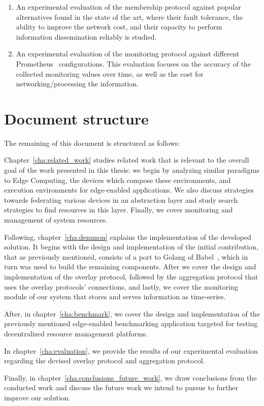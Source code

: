 \begin{enumerate}
    \item An experimental evaluation of the membership protocol against popular alternatives found in the state of the art, where their fault tolerance, the ability to improve the network cost, and their capacity to perform information dissemination reliably is studied. 

    \item An experimental evaluation of the monitoring protocol against different Prometheus~\cite{prometheus} configurations. This evaluation focuses on the accuracy of the collected monitoring values over time, as well as the cost for networking/processing the information.
    
\end{enumerate}

\section{Document structure}

The remaining of this document is structured as follows: 

Chapter~\ref{cha:related_work} studies related work that is relevant to the overall goal of the work presented in this thesis: we begin by analyzing similar paradigms to Edge Computing, the devices which compose these environments, and execution environments for edge-enabled applications. We also discuss strategies towards federating various devices in an abstraction layer and study search strategies to find resources in this layer. Finally, we cover monitoring and management of system resources.

Following, chapter~\ref{cha:demmon} explains the implementation of the developed solution. It begins with the design and implementation of the initial contribution, that as previously mentioned, consists of a port to Golang of Babel~\cite{babel}, which in turn was used to build the remaining components. After we cover the design and implementation of the overlay protocol, followed by the aggregation protocol that uses the overlay protocols' connections, and lastly, we cover the monitoring module of our system that stores and serves information as time-series.

After, in chapter~\ref{cha:benchmark}, we cover the design and implementation of the previously mentioned edge-enabled benchmarking application targeted for testing decentralized resource management platforms.

In chapter~\ref{cha:evaluation}, we provide the results of our experimental evaluation regarding the devised overlay protocol and aggregation protocol.

Finally, in chapter~\ref{cha:conclusions_future_work}, we draw conclusions from the conducted work and discuss the future work we intend to pursue to further improve our solution.